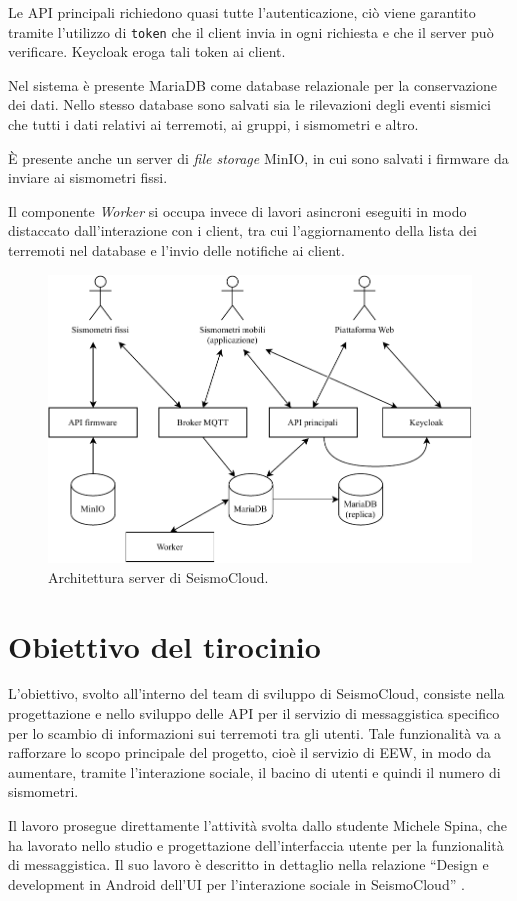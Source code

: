Le API principali richiedono quasi tutte l'autenticazione, ciò viene garantito tramite l'utilizzo di \texttt{token} che il client invia in ogni richiesta e che il server può verificare. Keycloak eroga tali token ai client.

Nel sistema è presente MariaDB come database relazionale per la conservazione dei dati. Nello stesso database sono salvati sia le rilevazioni degli eventi sismici che tutti i dati relativi ai terremoti, ai gruppi, i sismometri e altro.

È presente anche un server di \textit{file storage} MinIO, in cui sono salvati i firmware da inviare ai sismometri fissi.

Il componente \textit{Worker} si occupa invece di lavori asincroni eseguiti in modo distaccato dall'interazione con i client, tra cui l'aggiornamento della lista dei terremoti nel database e l'invio delle notifiche ai client.

\begin{figure}[ht!]
\centering
\includegraphics[width=\textwidth]{assets/01/architettura.pdf}
\caption{Architettura server di SeismoCloud.}
\label{fig:architettura}
\end{figure}

\section{Obiettivo del tirocinio}

L'obiettivo, svolto all'interno del team di sviluppo di SeismoCloud, consiste nella progettazione e nello sviluppo delle API per il servizio di messaggistica specifico per lo scambio di informazioni sui terremoti tra gli utenti. Tale funzionalità va a rafforzare lo scopo principale del progetto, cioè il servizio di EEW, in modo da aumentare, tramite l'interazione sociale, il bacino di utenti e quindi il numero di sismometri.

Il lavoro prosegue direttamente l'attività svolta dallo studente Michele Spina, che ha lavorato nello studio e progettazione dell'interfaccia utente per la funzionalità di messaggistica. Il suo lavoro è descritto in dettaglio nella relazione ``Design e development in Android dell’UI per l'interazione sociale in SeismoCloud'' \cite{michele}.